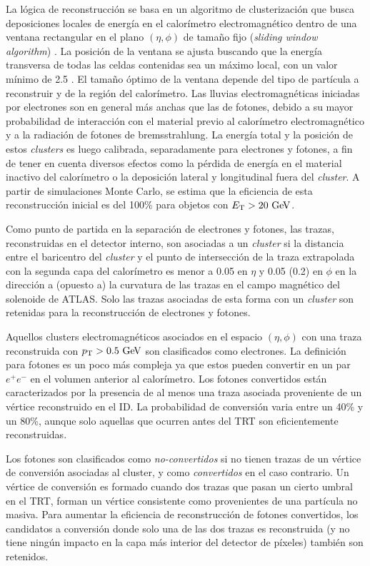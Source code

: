 La lógica de reconstrucción se basa en un algoritmo de clusterización que busca
deposiciones locales de energía en el calorímetro electromagnético dentro de una
ventana rectangular en el plano $(\eta, \phi)$ de tamaño fijo (\emph{sliding
  window algorithm}) \cite{Delmastro:1747242}. La posición de la ventana se
ajusta buscando que la energía transversa de todas las celdas contenidas sea un
máximo local, con un valor mínimo de 2.5 \gev. El tamaño óptimo de la ventana depende
del tipo de partícula a reconstruir y de la región del calorímetro. Las lluvias
electromagnéticas iniciadas por electrones son en general más anchas que las de
fotones, debido a su mayor probabilidad de interacción con el material previo al
calorímetro electromagnético y a la radiación de fotones de bremsstrahlung. La
energía total y la posición de estos \emph{clusters} es luego calibrada, separadamente
para electrones y fotones, a fin de tener en cuenta diversos efectos como la
pérdida de energía en el material inactivo del calorímetro o la deposición
lateral y longitudinal fuera del \emph{cluster}. A partir de simulaciones Monte Carlo,
se estima que la eficiencia de esta reconstrucción inicial es del 100\% para
objetos con $\et > 20 \gev$.

Como punto de partida en la separación de electrones y fotones, las trazas,
reconstruidas en el detector interno, son asociadas a un \emph{cluster} si la distancia
entre el baricentro del \emph{cluster} y el punto de intersección de la traza
extrapolada con la segunda capa del calorímetro es menor a 0.05 en $\eta$ y 0.05
(0.2) en $\phi$ en la dirección a (opuesto a) la curvatura de las trazas en el
campo magnético del solenoide de ATLAS. Solo las trazas asociadas de esta forma
con un \emph{cluster} son retenidas para la reconstrucción de electrones y fotones.

Aquellos clusters electromagnéticos asociados en el espacio $(\eta,\phi)$ con
una traza reconstruida con $\pt > 0.5 \gev$ son clasificados como electrones. La
definición para fotones es un poco más compleja ya que estos pueden convertir en
un par $e^+e^-$ en el volumen anterior al calorímetro. Los fotones convertidos
están caracterizados por la presencia de al menos una traza asociada proveniente
de un vértice reconstruido en el ID. La probabilidad de conversión varia entre
un 40\% y un 80\%, aunque solo aquellas que ocurren antes del TRT son
eficientemente reconstruidas.

Los fotones son clasificados como \emph{no-convertidos} si no tienen trazas de
un vértice de conversión asociadas al cluster, y como \emph{convertidos} en el
caso contrario. Un vértice de conversión es formado cuando dos trazas que pasan
un cierto umbral en el TRT, forman un vértice consistente como provenientes de
una partícula no masiva. Para aumentar la eficiencia de reconstrucción de
fotones convertidos, los candidatos a conversión donde solo una de las dos
trazas es reconstruida (y no tiene ningún impacto en la capa más interior del
detector de píxeles) también son retenidos.

